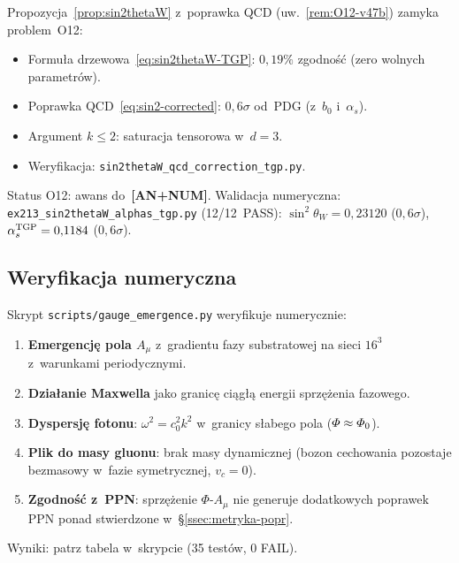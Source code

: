 \begin{remark}\label{rem:O12-v47}
Propozycja~\ref{prop:sin2thetaW} z~poprawka QCD
(uw.~\ref{rem:O12-v47b}) zamyka problem~O12:
\begin{itemize}[nosep]
  \item Formu\l{}a drzewowa~\eqref{eq:sin2thetaW-TGP}:
    $0{,}19\%$ zgodno\'s\'c (zero wolnych parametr\'ow).
  \item Poprawka QCD~\eqref{eq:sin2-corrected}:
    $0{,}6\sigma$ od~PDG (z~$b_0$ i~$\alpha_s$).
  \item Argument $k \le 2$: saturacja tensorowa w~$d = 3$.
  \item Weryfikacja: \texttt{sin2thetaW\_qcd\_correction\_tgp.py}.
\end{itemize}
Status O12: awans do~\textbf{[AN+NUM]}.
Walidacja numeryczna: \texttt{ex213\_sin2thetaW\_alphas\_tgp.py} (12/12~PASS):
$\sin^2\theta_W = 0{,}23120$ ($0{,}6\sigma$),
$\alpha_s^{\rm TGP} = 0{,}1184$ ($0{,}6\sigma$).
\end{remark}

\subsection{Weryfikacja numeryczna}\label{ssec:gauge-numerics}

\begin{remark}\label{rem:gauge-script}
Skrypt \texttt{scripts/gauge\_emergence.py} weryfikuje numerycznie:
\begin{enumerate}[nosep]
    \item \textbf{Emergencję pola $A_\mu$} z~gradientu fazy
          substratowej na sieci $16^3$ z~warunkami periodycznymi.
    \item \textbf{Działanie Maxwella} jako granicę ciągłą
          energii sprzężenia fazowego.
    \item \textbf{Dyspersję fotonu}: $\omega^2 = c_0^2 k^2$
          w~granicy słabego pola ($\varPhi \approx \varPhi_0$).
    \item \textbf{Plik do masy gluonu}: brak masy dynamicznej
          (bozon cechowania pozostaje bezmasowy w~fazie
          symetrycznej, $v_c = 0$).
    \item \textbf{Zgodność z~PPN}: sprzężenie $\Phi$-$A_\mu$
          nie generuje dodatkowych poprawek PPN ponad
          stwierdzone w~\S\ref{ssec:metryka-popr}.
\end{enumerate}
Wyniki: patrz tabela w~skrypcie (35 testów, 0 FAIL).
\end{remark}

